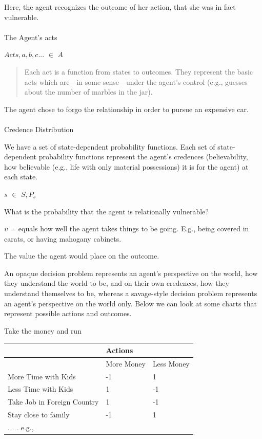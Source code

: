 \documentclass[
  letterpaper,
  DIV=11,
  numbers=noendperiod]{scrartcl}
\makeatletter
\let\oldparagraph\paragraph
\renewcommand{\paragraph}{
    \@ifstar
      \xxxParagraphStar
      \xxxParagraphNoStar
  }
\newcommand{\xxxParagraphStar}[1]{\oldparagraph*{#1}\mbox{}}
\newcommand{\xxxParagraphNoStar}[1]{\oldparagraph{#1}\mbox{}}
\newcounter{none} %
\makeatother
\begin{document}
Here, the agent recognizes the outcome of her action, that she was in
fact vulnerable.

\paragraph{The Agent's acts}\label{the-agents-acts}

\(Acts, a, b, c . . .\) \(\in\) \(A\)

\begin{quote}
Each act is a function from states to outcomes. They represent the basic
acts which are---in some sense---under the agent's control (e.g.,
guesses about the number of marbles in the jar).
\end{quote}

The agent chose to forgo the relationship in order to pursue an
expensive car.

\paragraph{Credence Distribution}\label{credence-distribution}

We have a set of state-dependent probability functions. Each set of
state-dependent probability functions represent the agent's credences
(believability, how believable (e.g., life with only material
possessions) it is for the agent) at each state.

\(s\) \(\in\) \(S, P_{s}\)

What is the probability that the agent is relationally vulnerable?

\(\upsilon\) = equals how well the agent takes things to be going. E.g.,
being covered in carats, or having mahogany cabinets.

The value the agent would place on the outcome.

An opaque decision problem represents an agent's perspective on the
world, how they understand the world to be, and on their own credences,
how they understand themselves to be, whereas a savage-style decision
problem represents an agent's perspective on the world only. Below we
can look at some charts that represent possible actions and outcomes.

Take the money and run

{\def\LTcaptype{none} %
\begin{longtable}[]{@{}lll@{}}
\toprule\noalign{}
& Actions & \\
\midrule\noalign{}
\endhead
\bottomrule\noalign{}
\endlastfoot
& More Money & Less Money \\
More Time with Kids & -1 & 1 \\
Less Time with Kids & 1 & -1 \\
Take Job in Foreign Country & 1 & -1 \\
Stay close to family & -1 & 1 \\
. . . e.g., & & \\
\end{longtable}
}
\end{document}
